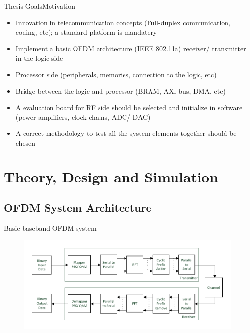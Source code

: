 \documentclass{beamer}
\begin{document}
\begin{frame}{Thesis Goals}{Motivation}
  \begin{itemize}
  
  \item {
Innovation in telecommunication concepts (Full-duplex communication, coding, etc); a standard platform is mandatory
  }
  
  \item {
Implement a basic OFDM architecture (IEEE 802.11a) receiver/ transmitter in the logic side
  }
  
  \item {  
Processor side (peripherals, memories, connection to the logic, etc)
  }
  
  \item {  
Bridge between the logic and processor (BRAM, AXI bus, DMA, etc)
  }
  
  \item {  
A evaluation board for RF side should be selected and initialize in software (power amplifiers, clock chains, ADC/ DAC)
  }
  
  \item {  
A correct methodology to test all the system elements together should be chosen
  }
  
     \end{itemize}
\end{frame}

\section{Theory, Design and Simulation}

\subsection{OFDM System Architecture}

\begin{frame}{Basic baseband OFDM system}
\begin{figure}[h!]
\centering
\includegraphics[width=\textwidth]{content/fig/basic_bb_ofdm.pdf}
\end{figure}
\end{frame}
\end{document}
